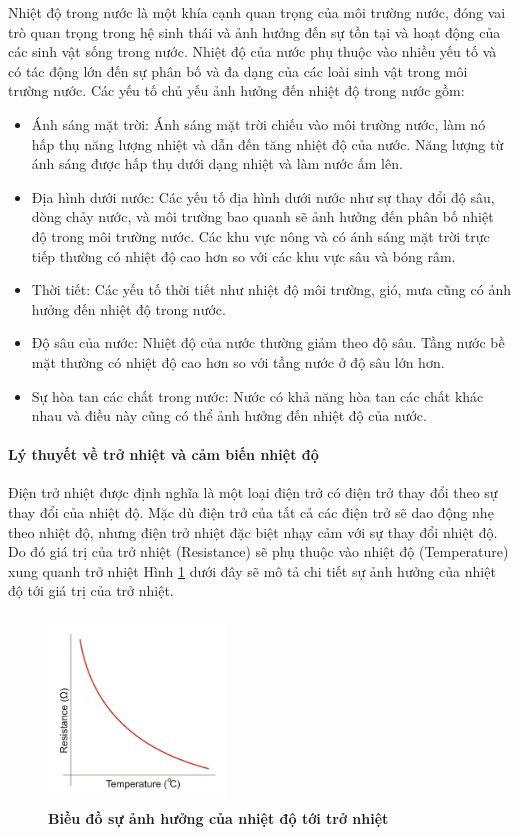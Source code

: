 \documentclass{article} %
\begin{document}
	Nhiệt độ trong nước là một khía cạnh quan trọng của môi trường nước, đóng vai trò quan trọng trong hệ sinh thái và ảnh hưởng đến sự tồn tại và hoạt động của các sinh vật sống trong nước. Nhiệt độ của nước phụ thuộc vào nhiều yếu tố và có tác động lớn đến sự phân bố và đa dạng của các loài sinh vật trong môi trường nước.
	Các yếu tố chủ yếu ảnh hưởng đến nhiệt độ trong nước gồm:
	
	\begin{itemize}
		\item Ánh sáng mặt trời: Ánh sáng mặt trời chiếu vào môi trường nước, làm nó hấp thụ năng lượng nhiệt và dẫn đến tăng nhiệt độ của nước. Năng lượng từ ánh sáng được hấp thụ dưới dạng nhiệt và làm nước ấm lên.
		\item Địa hình dưới nước: Các yếu tố địa hình dưới nước như sự thay đổi độ sâu, dòng chảy nước, và môi trường bao quanh sẽ ảnh hưởng đến phân bố nhiệt độ trong môi trường nước. Các khu vực nông và có ánh sáng mặt trời trực tiếp thường có nhiệt độ cao hơn so với các khu vực sâu và bóng râm.
		\item Thời tiết: Các yếu tố thời tiết như nhiệt độ môi trường, gió, mưa cũng có ảnh hưởng đến nhiệt độ trong nước.
		\item Độ sâu của nước: Nhiệt độ của nước thường giảm theo độ sâu. Tầng nước bề mặt thường có nhiệt độ cao hơn so với tầng nước ở độ sâu lớn hơn.
		\item Sự hòa tan các chất trong nước: Nước có khả năng hòa tan các chất khác nhau và điều này cũng có thể ảnh hưởng đến nhiệt độ của nước.
	\end{itemize}
	
	\paragraph{Lý thuyết về trở nhiệt và cảm biến nhiệt độ }\mbox{}
	
	Điện trở nhiệt được định nghĩa là một loại điện trở có điện trở thay đổi theo sự thay đổi của nhiệt độ. Mặc dù điện trở của tất cả các điện trở sẽ dao động nhẹ theo nhiệt độ, nhưng điện trở nhiệt đặc biệt nhạy cảm với sự thay đổi nhiệt độ. Do đó giá trị của trở nhiệt (Resistance) sẽ phụ thuộc vào nhiệt độ (Temperature) xung quanh trở nhiệt Hình \ref{pttemp} dưới đây sẽ mô tả chi tiết sự ảnh hưởng của nhiệt độ tới giá trị của trở nhiệt.
	
	
	\begin{figure}[!ht]
		\centering
		\includegraphics[width=4.7cm,height=5cm]{Images/pttemp.png}
		\caption[Biều đồ sự ảnh hưởng của nhiệt độ tới trở nhiệt\cite{NTC}]{\bfseries \fontsize{12pt}{0pt}\selectfont Biều đồ sự ảnh hưởng của nhiệt độ tới trở nhiệt\cite{NTC}}
		\label{pttemp}
	\end{figure}
	
\end{document}
